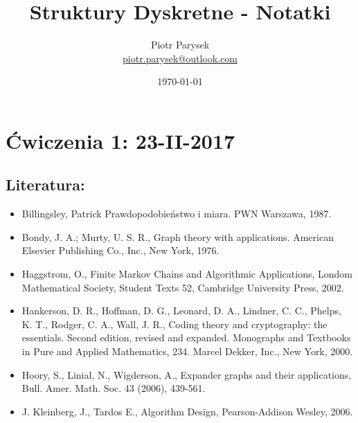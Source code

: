 \documentclass[a4paper,12pt]{article}
\title{Struktury Dyskretne - Notatki}
\author{Piotr Parysek\\
\href{mailto:piotr.parysek@outlook.com}{piotr.parysek@outlook.com} }
\date{\today}
\theoremstyle{definition}%
\theoremstyle{definition}
\theoremstyle{problem}
\begin{document}
\maketitle

\tableofcontents
\section{Ćwiczenia 1: 23-II-2017}
\subsection{Literatura:}
\begin{itemize}
\item Billingsley, Patrick Prawdopodobieństwo i miara. PWN Warszawa, 1987.
\item Bondy, J. A.; Murty, U. S. R., Graph theory with applications. American Elsevier Publishing Co., Inc., New York, 1976.
\item Haggstrom, O., Finite Markov Chains and Algorithmic Applications, Londom Mathematical Society, Student Texts 52, Cambridge University Press, 2002.
\item Hankerson, D. R., Hoffman, D. G., Leonard, D. A., Lindner, C. C., Phelps, K. T., Rodger, C. A., Wall, J. R., Coding theory and cryptography: the essentials. Second edition, revised and expanded. Monographs and Textbooks in Pure and Applied Mathematics, 234. Marcel Dekker, Inc., New York, 2000.
\item Hoory, S., Linial, N., Wigderson, A., Expander graphs and their applications, Bull. Amer. Math. Soc. 43 (2006), 439-561.
\item J. Kleinberg, J., Tardos E., Algorithm Design, Pearson-Addison Wesley, 2006.
\end{itemize}
\end{document}
